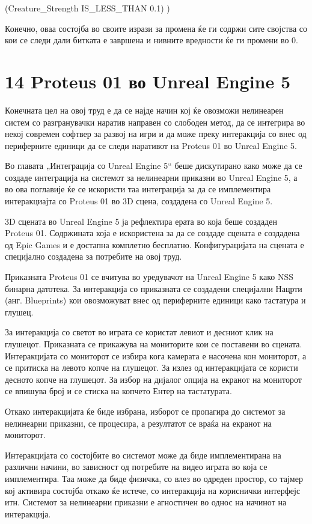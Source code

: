 (Creature\_Strength IS\_LESS\_THAN 0.1) )

Конечно, оваа состојба во своите изрази за промена ќе ги содржи сите својства со кои се следи дали битката е завршена и нивните вредности ќе ги промени во 0.

\section{14 Proteus 01 во Unreal Engine 5}

Конечната цел на овој труд е да се најде начин кој ќе овозможи нелинеарен систем со разгранувачки наратив направен со слободен метод, да се интегрира во некој современ софтвер за развој на игри и да може преку интеракција со внес од периферните единици да се следи наративот на Proteus 01 во Unreal Engine 5.

Во главата „Интеграција со Unreal Engine 5“ беше дискутирано како може да се создаде интеграција на системот за нелинеарни приказни во Unreal Engine 5, а во ова поглавије ќе се искористи таа интеграција за да се имплементира интеракциајта со Proteus 01 во 3D сцена, создадена со Unreal Engine 5.

3D сцената во Unreal Engine 5 ја рефлектира ерата во која беше создаден Proteus 01. Содржината која е искористена за да се создаде сцената е создадена од Epic Games и е достапна комплетно бесплатно. Конфигурацијата на сцената е специјално создадена за потребите на овој труд.

Приказната Proteus 01 се вчитува во уредувачот на Unreal Engine 5 како NSS бинарна датотека. За интеракција со приказната се создадени специјални Нацрти (анг. Blueprints) кои овозможуват внес од периферните единици како тастатура и глушец.

За интеракција со светот во играта се користат левиот и десниот клик на глушецот. Приказната се прикажува на мониторите кои се поставени во сцената. Интеракцијата со мониторот се избира кога камерата е насочена кон мониторот, а се притиска на левото копче на глушецот. За излез од интеракцијата се користи десното копче на глушецот. За избор на дијалог опција на екранот на мониторот се впишува број и се стиска на копчето Ентер на тастатурата.

Откако интеракцијата ќе биде избрана, изборот се пропагира до системот за нелинеарни приказни, се процесира, а резултатот се враќа на екранот на мониторот.

Интеракцијата со состојбите во системот може да биде имплементирана на различни начини, во зависност од потребите на видео играта во која се имплементира. Таа може да биде физичка, со влез во одреден простор, со тајмер кој активира состојба откако ќе истече, со интеракција на кориснички интерфејс итн. Системот за нелинеарни приказни е агностичен во однос на начинот на интеракција.

